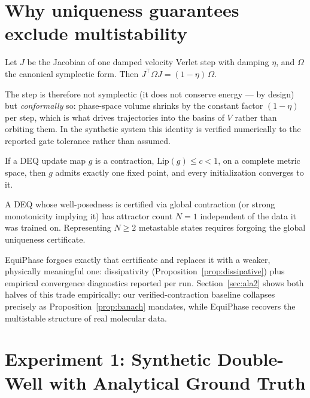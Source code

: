 \section{Why uniqueness guarantees exclude multistability}
\label{sec:theory}

\begin{proposition}
\label{prop:dissipative}
Let $J$ be the Jacobian of one damped velocity Verlet step with damping
$\eta$, and $\Omega$ the canonical symplectic form. Then
$J^\top \Omega J = (1-\eta)\,\Omega$.
\end{proposition}
The step is therefore not symplectic (it does not conserve energy — by
design) but \emph{conformally} so: phase-space volume shrinks by the
constant factor $(1-\eta)$ per step, which is what drives trajectories into
the basins of $V$ rather than orbiting them. In the synthetic system this
identity is verified numerically to the reported gate tolerance rather than
assumed.

\begin{proposition}
\label{prop:banach}
If a DEQ update map $g$ is a contraction, $\mathrm{Lip}(g)\le c<1$, on a
complete metric space, then $g$ admits exactly one fixed point, and every
initialization converges to it.
\end{proposition}

\begin{corollary}
A DEQ whose well-posedness is certified via global contraction (or strong
monotonicity implying it) has attractor count $N=1$ independent of the data
it was trained on. Representing $N\ge2$ metastable states requires forgoing
the global uniqueness certificate.
\end{corollary}
EquiPhase forgoes exactly that certificate and replaces it with a weaker,
physically meaningful one: dissipativity (Proposition~\ref{prop:dissipative})
plus empirical convergence diagnostics reported per run. Section~\ref{sec:ala2}
shows both halves of this trade empirically: our verified-contraction
baseline collapses precisely as Proposition~\ref{prop:banach} mandates,
while EquiPhase recovers the multistable structure of real molecular data.

\section{Experiment 1: Synthetic Double-Well with Analytical Ground Truth}
\label{sec:toy}

